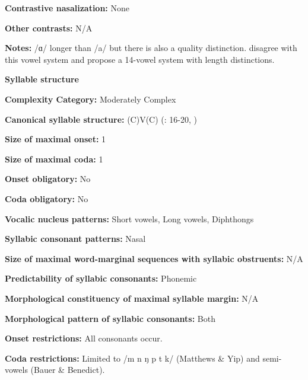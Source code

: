 \textbf{Contrastive nasalization:} None



\textbf{Other contrasts:} N/A



\textbf{Notes:} /ɑ/ longer than /a/ but there is also a quality distinction. \citet[45--48]{BauerBenedict1997} disagree with this vowel system and propose a 14-vowel system with length distinctions.



\textbf{Syllable structure}



\textbf{Complexity Category:} Moderately Complex



\textbf{Canonical syllable structure:} (C)V(C) (\citealt{MatthewsYip1994}: 16-20, \citealt{BauerBenedict1997})



\textbf{Size of maximal onset:} 1



\textbf{Size of maximal coda:} 1



\textbf{Onset obligatory:} No



\textbf{Coda obligatory:} No



\textbf{Vocalic nucleus patterns:} Short vowels, Long vowels, Diphthongs



\textbf{Syllabic consonant patterns:} Nasal



\textbf{Size of maximal word{}-marginal sequences with syllabic obstruents:} N/A



\textbf{Predictability of syllabic consonants:} Phonemic



\textbf{Morphological constituency of maximal syllable margin:} N/A



\textbf{Morphological pattern of syllabic consonants:} Both



\textbf{Onset restrictions:} All consonants occur.



\textbf{Coda restrictions:} Limited to /m n ŋ p t k/ (Matthews \& Yip) and semi-vowels (Bauer \& Benedict).




